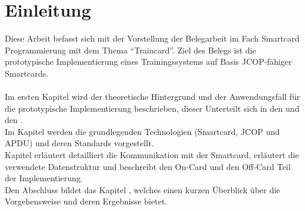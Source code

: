 \section{Einleitung}
\label{sec:0}
Diese Arbeit befasst sich mit der Vorstellung der Belegarbeit im Fach Smartcard Programmierung mit dem Thema ``Traincard''. 
Ziel des Belegs ist die prototypische Implementierung eines Trainingssystems auf Basis JCOP-fähiger Smartcards. 
\\
\\
Im ersten Kapitel  wird der theoretische Hintergrund und der Anwendungsfall für die prototypische Implementierung beschrieben, dieser Unterteilt sich in den  und den . \\
Im Kapitel  werden die grundlegenden Technologien (Smartcard, JCOP und APDU) und deren Standards vorgestellt. \\
Kapitel  erläutert detailliert die Kommunikation mit der Smartcard, erläutert die verwendete Datenstruktur und beschreibt den On-Card und den Off-Card Teil der Implementierung. \\
Den Abschluss bildet das Kapitel , welches einen kurzen Überblick über die Vorgehensweise und deren Ergebnisse bietet.
